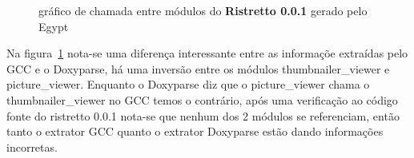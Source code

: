 \begin{figure}
\center
{}
\qquad
{}
\caption{gráfico de chamada entre módulos do {\bf Ristretto 0.0.1} gerado pelo Egypt}
\label{ristretto-0.0.1}
\end{figure}

Na figura~\ref{ristretto-0.0.1} nota-se uma diferença interessante entre as
informaçõe extraídas pelo GCC e o Doxyparse, há uma inversão entre os módulos
thumbnailer\_viewer e picture\_viewer. Enquanto o Doxyparse diz que o
picture\_viewer chama o thumbnailer\_viewer no GCC temos o contrário, após uma
verificação ao código fonte do ristretto 0.0.1 nota-se que nenhum dos 2 módulos
se referenciam, então tanto o extrator GCC quanto o extrator Doxyparse estão
dando informações incorretas.

